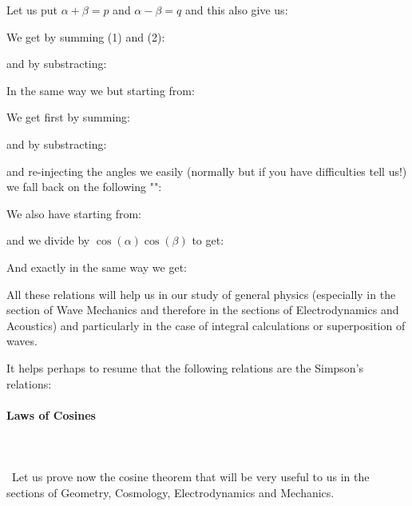	Let us put $\alpha+\beta=p$ and $\alpha-\beta=q$ and this also give us:
	
	We get by summing (1) and (2):
	
	and by substracting:
	
	In the same way we but starting from:
	
	We get first by summing:
	
	and by substracting:
	
	and re-injecting the angles we easily (normally but if you have difficulties tell us!) we fall back on the following "":
	
	
	We also have starting from:	
	
	and we divide by $\cos(\alpha)\cos(\beta)$ to get:
	
	And exactly in the same way we get:
	
	
	All these relations will help us in our study of general physics (especially in the section of Wave Mechanics and therefore in the sections of Electrodynamics and Acoustics) and particularly in the case of integral calculations or superposition of waves.
	
	\begin{tcolorbox}[title=Remark,colframe=black,arc=10pt]
It helps perhaps to resume that the following relations are the Simpson's relations:
	
	\end{tcolorbox}
	
	\paragraph{Laws of Cosines}\label{law of cosines}\mbox{}\\\\\
	Let us prove now the cosine theorem that will be very useful to us in the sections of Geometry, Cosmology, Electrodynamics and Mechanics.
	

